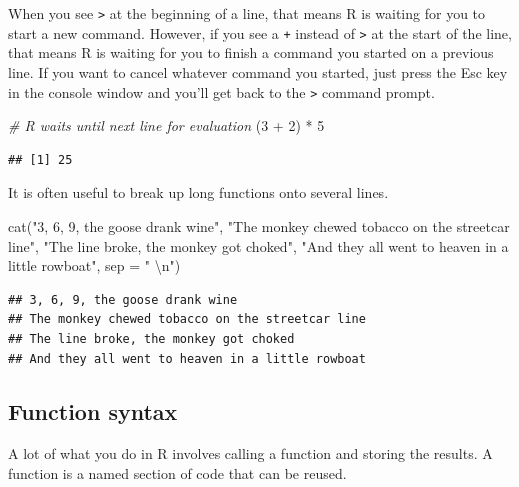 \documentclass[
  oneside]{book}
\newenvironment{Shaded}{\begin{snugshade}}{\end{snugshade}}
\newcommand{\AttributeTok}[1]{\textcolor[rgb]{0.77,0.63,0.00}{#1}}
\newcommand{\CommentTok}[1]{\textcolor[rgb]{0.56,0.35,0.01}{\textit{#1}}}
\newcommand{\DecValTok}[1]{\textcolor[rgb]{0.00,0.00,0.81}{#1}}
\newcommand{\FunctionTok}[1]{\textcolor[rgb]{0.00,0.00,0.00}{#1}}
\newcommand{\NormalTok}[1]{#1}
\newcommand{\SpecialCharTok}[1]{\textcolor[rgb]{0.00,0.00,0.00}{#1}}
\newcommand{\StringTok}[1]{\textcolor[rgb]{0.31,0.60,0.02}{#1}}
\begin{document}
When you see \texttt{\textgreater{}} at the beginning of a line, that means R is waiting for you to start a new command. However, if you see a \texttt{+} instead of \texttt{\textgreater{}} at the start of the line, that means R is waiting for you to finish a command you started on a previous line. If you want to cancel whatever command you started, just press the Esc key in the console window and you'll get back to the \texttt{\textgreater{}} command prompt.

\begin{Shaded}
\begin{Highlighting}[]
\CommentTok{\# R waits until next line for evaluation}
\NormalTok{(}\DecValTok{3} \SpecialCharTok{+} \DecValTok{2}\NormalTok{) }\SpecialCharTok{*}
     \DecValTok{5}
\end{Highlighting}
\end{Shaded}

\begin{verbatim}
## [1] 25
\end{verbatim}

It is often useful to break up long functions onto several lines.

\begin{Shaded}
\begin{Highlighting}[]
\FunctionTok{cat}\NormalTok{(}\StringTok{"3, 6, 9, the goose drank wine"}\NormalTok{,}
    \StringTok{"The monkey chewed tobacco on the streetcar line"}\NormalTok{,}
    \StringTok{"The line broke, the monkey got choked"}\NormalTok{,}
    \StringTok{"And they all went to heaven in a little rowboat"}\NormalTok{,}
    \AttributeTok{sep =} \StringTok{"  }\SpecialCharTok{\textbackslash{}n}\StringTok{"}\NormalTok{)}
\end{Highlighting}
\end{Shaded}

\begin{verbatim}
## 3, 6, 9, the goose drank wine  
## The monkey chewed tobacco on the streetcar line  
## The line broke, the monkey got choked  
## And they all went to heaven in a little rowboat
\end{verbatim}

\hypertarget{function_syx}{%
\subsection{Function syntax}\label{function_syx}}

A lot of what you do in R involves calling a function and storing the results. A function is a named section of code that can be reused.
\end{document}
